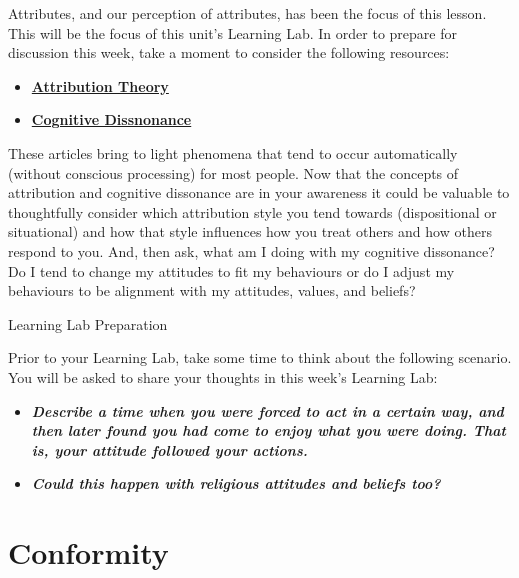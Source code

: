 \documentclass[
]{book}
\providecommand{\tightlist}{%
  \setlength{\itemsep}{0pt}\setlength{\parskip}{0pt}}
\begin{document}
\begin{reflect}
Attributes, and our perception of attributes, has been the focus of this lesson. This will be the focus of this unit's Learning Lab. In order to prepare for discussion this week, take a moment to consider the following resources:

\begin{itemize}
\tightlist
\item
  \href{https://www.verywellmind.com/attribution-social-psychology-2795898}{\textbf{Attribution Theory}}\\
\item
  \href{https://www.simplypsychology.org/cognitive-dissonance.html}{\textbf{Cognitive Dissnonance}}
\end{itemize}

These articles bring to light phenomena that tend to occur automatically (without conscious processing) for most people. Now that the concepts of attribution and cognitive dissonance are in your awareness it could be valuable to thoughtfully consider which attribution style you tend towards (dispositional or situational) and how that style influences how you treat others and how others respond to you. And, then ask, what am I doing with my cognitive dissonance? Do I tend to change my attitudes to fit my behaviours or do I adjust my behaviours to be alignment with my attitudes, values, and beliefs?

{Learning Lab Preparation}

Prior to your Learning Lab, take some time to think about the following scenario. You will be asked to share your thoughts in this week's Learning Lab:

\begin{itemize}
\tightlist
\item
  \textbf{\emph{Describe a time when you were forced to act in a certain way, and then later found you had come to enjoy what you were doing. That is, your attitude followed your actions.}}\\
\item
  \textbf{\emph{Could this happen with religious attitudes and beliefs too?}}
\end{itemize}
\end{reflect}

\hypertarget{conformity}{%
\section{Conformity}\label{conformity}}
\end{document}
